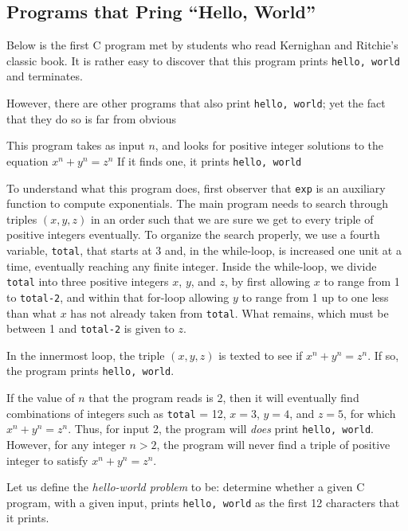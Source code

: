 \documentclass[]{article}
\begin{document}
\subsection*{Programs that Pring ``Hello, World''}
Below is the first C program met by students who read Kernighan and 
Ritchie's classic book. It is rather easy to discover that this program 
prints \texttt{hello, world} and terminates.



However, there are other programs that also print \texttt{hello, world}; 
yet the fact that they do so is far from obvious



This program takes as input $n$, and looks for positive integer solutions 
to the equation $x^n + y^n = z^n$ If it finds one, it prints 
\texttt{hello, world}

To understand what this program does, first observer that \texttt{exp} is 
an auxiliary function to compute exponentials. The main program needs to 
search through triples $(x,y,z)$ in an order such that we are sure we get 
to every triple of positive integers eventually. To organize the search 
properly, we use a fourth variable, \texttt{total}, that starts at 3 and, 
in the while-loop, is increased one unit at a time, eventually reaching any 
finite integer. Inside the while-loop, we divide \texttt{total} into three 
positive integers $x$, $y$, and $z$, by first allowing $x$ to range from 1 
to \texttt{total-2}, and within that for-loop allowing $y$ to range from 1 
up to one less than what $x$ has not already taken from \texttt{total}. 
What remains, which must be between 1 and \texttt{total-2} is given to $z$.

In the innermost loop, the triple $(x,y,z)$ is texted to see if
$x^n + y^n = z^n$. If so, the program prints \texttt{hello, world}.

If the value of $n$ that the program reads is 2, then it will eventually 
find combinations of integers such as \texttt{total} = 12, 
$x = 3$, $y = 4$,
and $z = 5$, for which $x^n + y^n = z^n$. Thus, for input 2, the program 
will \emph{does} print \texttt{hello, world}. However, for any integer 
$n > 2$, the program will never find a triple of positive integer to 
satisfy $x^n + y^n = z^n$.

Let us define the \emph{hello-world problem} to be: determine whether a 
given C program, with a given input, prints \texttt{hello, world} as the 
first 12 characters that it prints.
\end{document}
